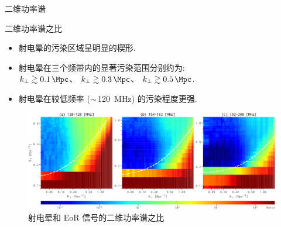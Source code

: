 \documentclass{beamer}
\begin{document}
\begin{frame}{二维功率谱}
  \vspace{-1ex}
\end{frame}

\begin{frame}{二维功率谱之比}
  \begin{itemize}
    \item 射电晕的污染区域呈明显的楔形.
    \item 射电晕在三个频带内的显著污染范围分别约为: \\
      $k_{\perp} \gtrsim \SI{0.1}{\per\Mpc}$、
      $k_{\perp} \gtrsim \SI{0.3}{\per\Mpc}$、
      $k_{\perp} \gtrsim \SI{0.5}{\per\Mpc}$.
    \item 射电晕在较低频率 ($\sim$\,\SI{120}{\MHz}) 的污染程度更强.
  \end{itemize}

  \begin{figure}
    \centering
    \includegraphics[width=\textwidth]{ps2d-ratio-3bands}
    \caption{射电晕和 EoR 信号的二维功率谱之比}
  \end{figure}
\end{frame}
\end{document}

